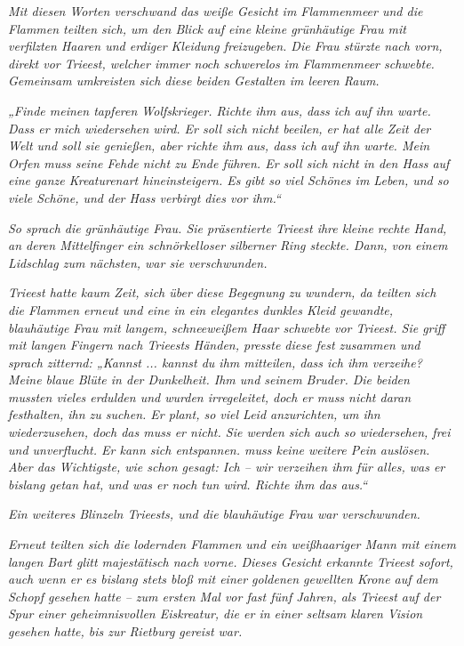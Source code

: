 \textit{Mit diesen Worten verschwand das weiße Gesicht im Flammenmeer und die Flammen teilten sich, um den Blick auf eine kleine grünhäutige Frau mit verfilzten Haaren und erdiger Kleidung freizugeben. Die Frau stürzte nach vorn, direkt vor Trieest, welcher immer noch schwerelos im Flammenmeer schwebte. Gemeinsam umkreisten sich diese beiden Gestalten im leeren Raum.}

\textit{„Finde meinen tapferen Wolfskrieger. Richte ihm aus, dass ich auf ihn warte. Dass er mich wiedersehen wird. Er soll sich nicht beeilen, er hat alle Zeit der Welt und soll sie genießen, aber richte ihm aus, dass ich auf ihn warte. Mein Orfen muss seine Fehde nicht zu Ende führen. Er soll sich nicht in den Hass auf eine ganze Kreaturenart hineinsteigern. Es gibt so viel Schönes im Leben, und so viele Schöne, und der Hass verbirgt dies vor ihm.“}

\textit{So sprach die grünhäutige Frau. Sie präsentierte Trieest ihre kleine rechte Hand, an deren Mittelfinger ein schnörkelloser silberner Ring steckte. Dann, von einem Lidschlag zum nächsten, war sie verschwunden.}

\textit{Trieest hatte kaum Zeit, sich über diese Begegnung zu wundern, da teilten sich die Flammen erneut und eine in ein elegantes dunkles Kleid gewandte, blauhäutige Frau mit langem, schneeweißem Haar schwebte vor Trieest. Sie griff mit langen Fingern nach Trieests Händen, presste diese fest zusammen und sprach zitternd: „Kannst ... kannst du ihm mitteilen, dass ich ihm verzeihe? Meine blaue Blüte in der Dunkelheit. Ihm und seinem Bruder. Die beiden mussten vieles erdulden und wurden irregeleitet, doch er muss nicht daran festhalten, ihn zu suchen. Er plant, so viel Leid anzurichten, um ihn wiederzusehen, doch das muss er nicht. Sie werden sich auch so wiedersehen, frei und unverflucht. Er kann sich entspannen. muss keine weitere Pein auslösen. Aber das Wichtigste, wie schon gesagt: Ich – wir verzeihen ihm für alles, was er bislang getan hat, und was er noch tun wird. Richte ihm das aus.“}

\textit{Ein weiteres Blinzeln Trieests, und die blauhäutige Frau war verschwunden.}

\textit{Erneut teilten sich die lodernden Flammen und ein weißhaariger Mann mit einem langen Bart glitt majestätisch nach vorne. Dieses Gesicht erkannte Trieest sofort, auch wenn er es bislang stets bloß mit einer goldenen gewellten Krone auf dem Schopf gesehen hatte – zum ersten Mal vor fast fünf Jahren, als Trieest auf der Spur einer geheimnisvollen Eiskreatur, die er in einer seltsam klaren Vision gesehen hatte, bis zur Rietburg gereist war.}

